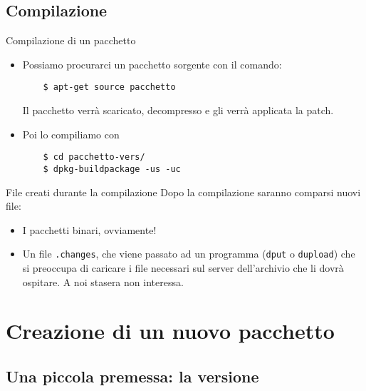 \documentclass{beamer}
\begin{document}
\subsection{Compilazione}

\begin{frame}[fragile]{Compilazione di un pacchetto}
	\begin{itemize}
	\item Possiamo procurarci un pacchetto sorgente con il comando:
	\begin{verbatim}
	$ apt-get source pacchetto
	\end{verbatim}
	Il pacchetto verrà scaricato, decompresso e gli verrà applicata la patch.
	\pause
	\item Poi lo compiliamo con
	\begin{verbatim}
	$ cd pacchetto-vers/
	$ dpkg-buildpackage -us -uc
	\end{verbatim}
	\end{itemize}
\end{frame}

\begin{frame}{File creati durante la compilazione}
	Dopo la compilazione saranno comparsi nuovi file:
		\begin{itemize}
		\item I pacchetti binari, ovviamente!
		\pause
		\item Un file {\tt .changes}, che viene passato ad un programma ({\tt dput} o {\tt dupload}) che si preoccupa di caricare i file necessari sul server dell'archivio che li dovrà ospitare. A noi stasera non interessa.
		\end{itemize}
\end{frame}

\section{Creazione di un nuovo pacchetto}

\begin{frame}
\tableofcontents[currentsection]
\end{frame}

\subsection{Una piccola premessa: la versione}
\end{document}

